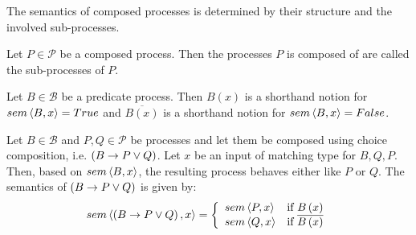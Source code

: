 The semantics of composed processes is determined by their structure and the involved sub-processes.

\begin{definition}
Let $P \in \mathcal{P}$ be a composed process. Then the processes $P$ is composed of are called the sub-processes of $P$.

\hfill\qedsymbol
\end{definition}

\begin{definition}
Let $B \in \mathcal{B}$ be a predicate process. Then $B \left( x \right)$ is a shorthand notion for $sem \left\langle B, x \right\rangle = True$ and $\overline{B \left( x \right)}$ is a shorthand notion for $sem \left\langle B, x \right\rangle = False$.

\hfill\qedsymbol
\end{definition}

\begin{definition}
\label{def:sem_choice}
Let $B \in \mathcal{B}$ and $P, Q \in \mathcal{P}$ be processes and let them be composed using choice composition, i.e. $\left( B \to P \vee Q \right)$. Let $x$ be an input of matching type for $B, Q, P$. Then, based on $sem \left\langle B, x \right\rangle$, the resulting process behaves either like $P$ or $Q$. The semantics of $\left( B \to P \vee Q \right)$ is given by:
  \begin{equation}
    \label{eqn:sem_choice}
    sem \left\langle \left( B \to P \vee Q \right), x \right\rangle = \left\{ \begin{array}{ll}
      sem \left\langle P, x \right\rangle & \text{if } B \left( x \right) \\
      sem \left\langle Q, x \right\rangle & \text{if } \overline{B \left( x \right)}
    \end{array}\right.
  \end{equation}
  
  \hfill\qedsymbol
\end{definition}

